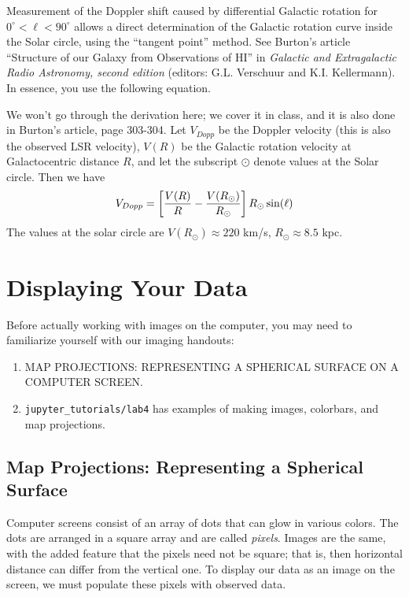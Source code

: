 \documentclass[psfig,preprint]{aastex}
\begin{document}
\noindent
          Measurement of the Doppler shift caused by differential
Galactic rotation for $0^\circ < \ell < 90^\circ$ allows a direct
determination of the Galactic rotation curve inside the Solar circle,
using the ``tangent point'' method. See Burton's article ``Structure
of our Galaxy from Observations of HI'' in {\it Galactic and
Extragalactic Radio Astronomy, second edition} (editors: G.L. Verschuur
and K.I. Kellermann). In essence, you use the following equation.

	We won't go through the derivation here; we cover it in class,
and it is also done in Burton's article,
page 303-304.  Let $V_{Dopp}$ be the Doppler velocity (this is also the
observed LSR velocity), $V(R)$ be the Galactic rotation velocity at
Galactocentric distance $R$, and let the subscript $\odot$ denote values
at the Solar circle.  Then we have
\begin{equation} \label{vdopp}
V_{Dopp} = \left[ {V(R) \over R} - {V(R_\odot) \over R_\odot}\right]
R_\odot \sin(\ell)
\end{equation}
\noindent The values at the solar circle are $V(R_\odot) \approx 220$
km/s, $R_\odot \approx 8.5$ kpc.

\section{Displaying Your Data} \label{datadisplay}

\noindent
Before actually working with images on the computer, you may need to
familiarize yourself with our imaging handouts:
\begin{enumerate}

\item MAP PROJECTIONS: REPRESENTING A SPHERICAL SURFACE ON A COMPUTER
  SCREEN.

\item {\tt jupyter\_tutorials/lab4} has examples of making images, colorbars, and map projections.
\end{enumerate}

\subsection{Map Projections: Representing a Spherical Surface}

\noindent
Computer screens consist of an array of dots that can glow in various
colors. The dots are arranged in a square array and are called {\it
  pixels}. Images are the same, with the added feature that
the pixels need not be square; that is, then horizontal distance can
differ from the vertical one. To display our data as an image on the
screen, we must populate these pixels with observed data. 
\end{document}
